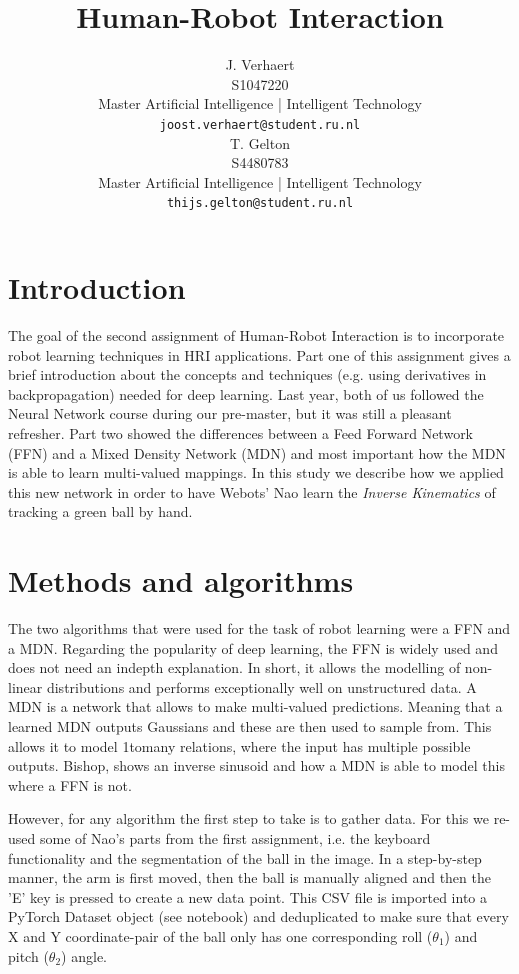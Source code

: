 \documentclass{article}
\title{Human-Robot Interaction}
\date{}
\author{
    J. Verhaert \\
    S1047220\\
    Master Artificial Intelligence | Intelligent Technology \\
    \texttt{joost.verhaert@student.ru.nl} \\
    \And
    T. Gelton \\
    S4480783\\
    Master Artificial Intelligence | Intelligent Technology \\
    \texttt{thijs.gelton@student.ru.nl} \\
}
\begin{document}
    \maketitle
    \pagebreak


    \section{Introduction}\label{sec:introduction}
    The goal of the second assignment of Human-Robot Interaction is to incorporate robot learning techniques in HRI applications. Part one of this assignment gives a brief introduction about the concepts and techniques (e.g. using derivatives in backpropagation) needed for deep learning. Last year, both of us followed the Neural Network course during our pre-master, but it was still a pleasant refresher. Part two showed the differences between a Feed Forward Network (FFN) and a Mixed Density Network (MDN) and most important how the MDN is able to learn multi-valued mappings. In this study we describe how we applied this new network in order to have Webots' Nao learn the \textit{Inverse Kinematics} of tracking a green ball by hand.

    \section{Methods and algorithms}\label{sec:methods-and-algorithms}
    The two algorithms that were used for the task of robot learning were a FFN and a MDN.
    Regarding the popularity of deep learning, the FFN is widely used and does not need an in\-depth explanation.
    In short, it allows the modelling of non-linear distributions and performs exceptionally well on unstructured data.
    A MDN is a network that allows to make multi-valued predictions.
    Meaning that a learned MDN outputs Gaussians and these are then used to sample from.
    This allows it to model 1\-to\-many relations, where the input has multiple possible outputs.
    Bishop\cite{bishop1994mixture}, shows an inverse sinusoid and how a MDN is able to model this where a FFN is not.

    However, for any algorithm the first step to take is to gather data.
    For this we re-used some of Nao's parts from the first assignment, i.e. the keyboard functionality and the segmentation of the ball in the image.
    In a step-by-step manner, the arm is first moved, then the ball is manually aligned and then the 'E' key is pressed to create a new data point.
    This CSV file is imported into a PyTorch Dataset object (see notebook) and deduplicated to make sure that every X and Y coordinate-pair of the ball only has one corresponding roll ($\theta_1$) and pitch ($\theta_2$) angle.
\end{document}
